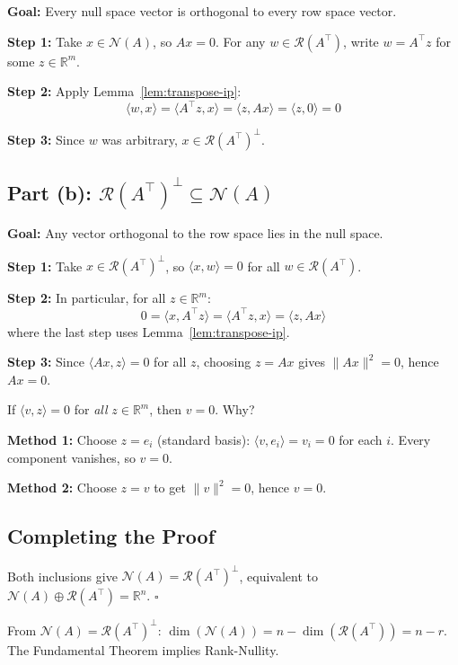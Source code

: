 \documentclass[10pt, twocolumn]{article}
\theoremstyle{definition}
\theoremstyle{plain}
\newcommand{\RR}{\mathbb{R}}
\newcommand{\NN}{\mathcal{N}}
\newcommand{\Range}{\mathcal{R}}
\begin{document}
\textbf{Goal:} Every null space vector is orthogonal to every row space vector.

\textbf{Step 1:} Take $x \in \NN(A)$, so $Ax = 0$. For any $w \in \Range(A^\top)$, write $w = A^\top z$ for some $z \in \RR^m$.

\textbf{Step 2:} Apply Lemma~\ref{lem:transpose-ip}:
\[
    \langle w, x \rangle = \langle A^\top z, x \rangle = \langle z, Ax \rangle = \langle z, 0 \rangle = 0
\]

\textbf{Step 3:} Since $w$ was arbitrary, $x \in \Range(A^\top)^\perp$.

\subsection{Part (b): $\Range(A^\top)^\perp \subseteq \NN(A)$}

\textbf{Goal:} Any vector orthogonal to the row space lies in the null space.

\textbf{Step 1:} Take $x \in \Range(A^\top)^\perp$, so $\langle x, w \rangle = 0$ for all $w \in \Range(A^\top)$.

\textbf{Step 2:} In particular, for all $z \in \RR^m$:
\[
    0 = \langle x, A^\top z \rangle = \langle A^\top z, x \rangle = \langle z, Ax \rangle
\]
where the last step uses Lemma~\ref{lem:transpose-ip}.

\textbf{Step 3:} Since $\langle Ax, z \rangle = 0$ for all $z$, choosing $z = Ax$ gives $\|Ax\|^2 = 0$, hence $Ax = 0$.

\begin{tcolorbox}[colframe=black!50, title={\small The Finishing Move: Why This Works}]
If $\langle v, z \rangle = 0$ for \emph{all} $z \in \RR^m$, then $v = 0$. Why?

\textbf{Method 1:} Choose $z = e_i$ (standard basis): $\langle v, e_i \rangle = v_i = 0$ for each $i$. Every component vanishes, so $v = 0$.

\textbf{Method 2:} Choose $z = v$ to get $\|v\|^2 = 0$, hence $v = 0$.
\end{tcolorbox}

\subsection{Completing the Proof}

Both inclusions give $\NN(A) = \Range(A^\top)^\perp$, equivalent to $\NN(A) \oplus \Range(A^\top) = \RR^n$. $\square$

\begin{tcolorbox}[colframe=black!50, title={\small Corollary: Rank-Nullity}]
From $\NN(A) = \Range(A^\top)^\perp$: $\dim(\NN(A)) = n - \dim(\Range(A^\top)) = n - r$. The Fundamental Theorem implies Rank-Nullity.
\end{tcolorbox}
\end{document}
